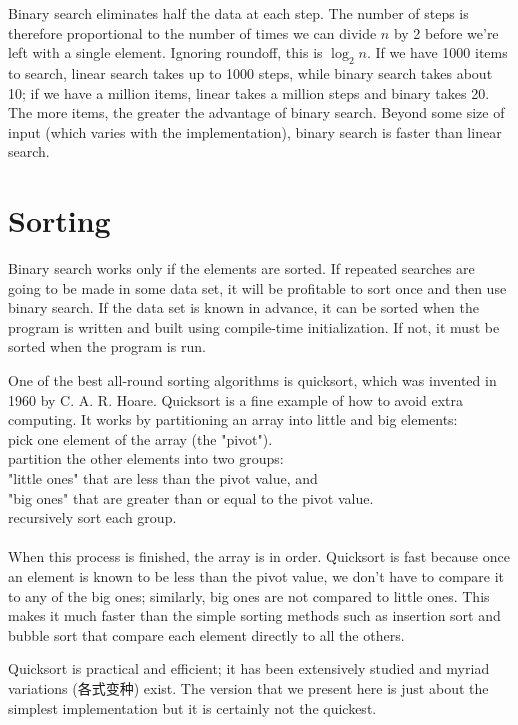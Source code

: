 Binary search eliminates half the data at each step. The number of steps is
therefore proportional to the number of times we can divide $n$ by 2
before we're left with a single element. Ignoring roundoff, this is
$\log_2n$.
If we have 1000 items to search, linear search takes up to 1000 steps,
while binary search takes about 10; if we have a million items, linear
takes a million steps and binary takes 20. The more items, the greater the
advantage of binary search. Beyond some size of input (which varies with
the implementation), binary search is faster than linear search.

\section{Sorting}
\label{sec:sorting}
Binary search works only if the elements are sorted. If repeated searches
are going to be made in some data set, it will be profitable to sort once
and then use binary search. If the data set is known in advance, it can be
sorted when the program is written and built using compile-time
initialization. If not, it must be sorted when the program is run.

One of the best all-round sorting algorithms is quicksort, which was
invented in 1960 by C. A. R. Hoare. Quicksort is a fine example of how to
avoid extra computing. It works by partitioning an array into little and
big elements:\\

\indent \indent pick one element of the array (the "pivot").
\\
\indent \indent partition the other elements into two groups:
\\
\indent \indent \indent "little ones" that are less than the pivot value,
and   \\
\indent \indent \indent "big ones" that are greater than or equal to the
pivot value.  \\
\indent \indent recursively sort each group.\\ \\
When this process is finished, the array is in order. Quicksort is fast
because once an element is known to be less than the pivot value, we don't
have to compare it to any of the big ones; similarly, big ones are not
compared to little ones. This makes it much faster than the simple sorting
methods such as insertion sort and bubble sort that compare each element
directly to all the others.

Quicksort is practical and efficient; it has been extensively studied and
myriad variations (各式变种) exist. The version that we present here is
just about the simplest implementation but it is certainly not the
quickest.

